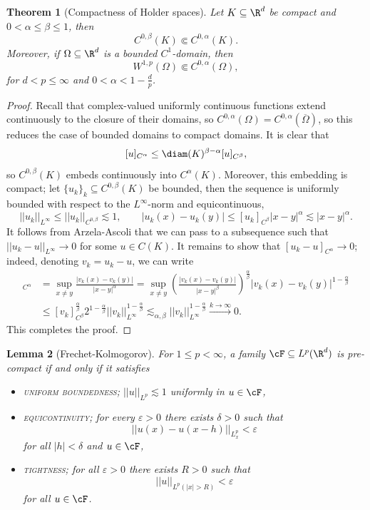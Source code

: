 \documentclass[reqno]{amsart}
\newtheorem{theorem}{Theorem}
\newtheorem{lemma}[theorem]{Lemma}
\theoremstyle{definition}
\theoremstyle{remark}
\renewcommand{\epsilon}{\varepsilon}
\renewcommand{\emph}{\textsc}
\begin{document}
\begin{theorem}[Compactness of Holder spaces]
	Let $K \subseteq \R^d$ be compact and $0 < \alpha \leq \beta \leq 1$, then 
		\[ C^{0, \beta} (K) \Subset C^{0, \alpha} (K). \]
	Moreover, if $\Omega \subseteq \R^d$ is a bounded $C^1$-domain, then 
		\[ W^{1, p} (\Omega) \Subset C^{0, \alpha} (\Omega), \]
	for $d < p \leq \infty$ and $0 < \alpha < 1 - \tfrac{d}{p}$.
\end{theorem}

\begin{proof}
	Recall that complex-valued uniformly continuous functions extend continuously to the closure of their domains, so $C^{0, \alpha} (\Omega) = C^{0, \alpha} (\overline \Omega)$, so this reduces the case of bounded domains to compact domains. It is clear that
		\[ [u]_{C^\alpha} \leq \diam (K)^{\beta - \alpha} [u]_{C^\beta},\]
	so $C^{0, \beta} (	K)$ embeds continuously into $C^{\alpha} (K)$. Moreover, this embedding is compact; let $\{ u_k \}_k \subseteq C^{0, \beta} (K)$ be bounded, then the sequence is uniformly bounded with respect to the $L^\infty$-norm and equicontinuous, 
		\[ ||u_k||_{L^\infty} \leq ||u_k||_{C^{0, \beta}} \lesssim 1, \qquad |u_k (x) - u_k (y)| \leq [u_k]_{C^\beta} |x - y|^\alpha \lesssim |x - y|^\alpha. \]
	It follows from Arzela-Ascoli that we can pass to a subsequence such that $||u_k - u||_{L^\infty} \to 0$ for some $u \in C(K)$. It remains to show that $[u_k - u]_{C^\alpha} \to 0$; indeed, denoting $v_k = u_k - u$, we can write
		\begin{align*}
			[v_k]_{C^\alpha} 
				&= \sup_{x \neq y} \frac{|v_k (x) - v_k (y)|}{|x - y|^\alpha} =  \sup_{x \neq y} \left( \frac{|v_k (x) - v_k (y)|}{|x - y|^\beta}\right)^{\frac\alpha\beta} |v_k (x) - v_k (y)|^{1 - \frac\alpha\beta} \\
				&\leq [v_k]_{C^\beta}^{\frac\alpha\beta} 2^{1 - \frac\alpha\beta} ||v_k||_{L^\infty}^{1 - \frac\alpha \beta} \lesssim_{\alpha, \beta} ||v_k||_{L^\infty}^{1 - \frac\alpha \beta} \overset{k \to \infty}{\longrightarrow} 0.
		\end{align*} 		
	This completes the proof. 	
\end{proof}

\begin{lemma}[Frechet-Kolmogorov]
	For $1 \leq p < \infty$, a family $\cF \subseteq L^p (\R^d)$ is pre-compact if and only if it satisfies
	\begin{itemize}
		\item \emph{uniform boundedness}; $||u||_{L^p} \lesssim 1$ uniformly in $u \in \cF$, 
		\item \emph{equicontinuity}; for every $\epsilon > 0$ there exists $\delta > 0$ such that 
					\[ ||u(x) - u(x - h)||_{L^p_x} < \epsilon\]
				for all $|h| < \delta$ and $u \in \cF$, 
		\item \emph{tightness}; for all $\epsilon > 0$ there exists $R> 0$ such that 
					\[ ||u||_{L^p (|x| > R)} < \epsilon \]
				for all $u \in \cF$. 	
	\end{itemize}
\end{lemma}
\end{document}
